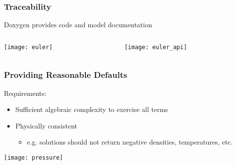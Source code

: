 \documentclass[mathserif]{beamer}
\begin{document}

\begin{frame}
  \frametitle{Traceability}
  Doxygen provides code and model documentation
  \begin{columns}[c]

    \begin{column}{6cm}
      \texttt{[image: euler]}   \\
    \end{column}

    \begin{column}{12cm}
      \texttt{[image: euler\_api]} \\
    \end{column}

  \end{columns}    

\end{frame}

\begin{frame}
  \frametitle{Providing Reasonable Defaults}

  \begin{block}{Requirements:}
  \begin{itemize}
    \item Sufficient algebraic complexity to exercise all terms
    \item Physically consistent
      \begin{itemize}
        \item e.g. solutions should not return negative densities, temperatures, etc.
      \end{itemize}      
  \end{itemize}
  \end{block}

  \begin{center}
    \texttt{[image: pressure]}\\
  \end{center}

\end{frame}

\end{document}
